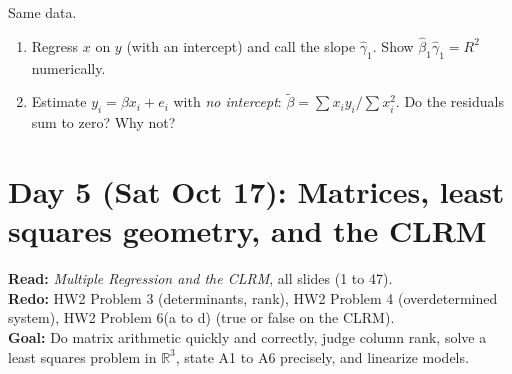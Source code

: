 \documentclass[11pt]{article}
\begin{document}
Same data.
\begin{enumerate}[label=(\alph*)]
  \item Regress $x$ on $y$ (with an intercept) and call the slope $\hat\gamma_1$. Show $\hat\beta_1\hat\gamma_1=R^2$ numerically.
  \item Estimate $y_i=\beta x_i+e_i$ with \emph{no intercept}: $\tilde\beta=\sum x_iy_i/\sum x_i^2$. Do the residuals sum to zero? Why not?
\end{enumerate}

\clearpage
\section{Day 5 (Sat Oct 17): Matrices, least squares geometry, and the CLRM}

\begin{planbox}
\textbf{Read:} \emph{Multiple Regression and the CLRM}, all slides (1 to 47).\\
\textbf{Redo:} HW2 Problem 3 (determinants, rank), HW2 Problem 4 (overdetermined system), HW2 Problem 6(a to d) (true or false on the CLRM).\\
\textbf{Goal:} Do matrix arithmetic quickly and correctly, judge column rank, solve a least squares problem in $\mathbb{R}^3$, state A1 to A6 precisely, and linearize models.
\end{planbox}
\end{document}
